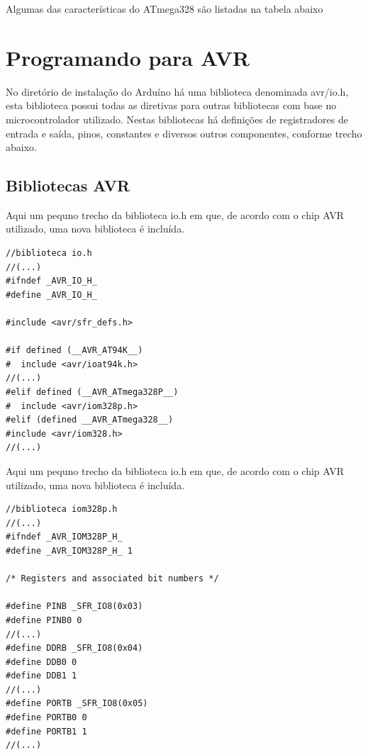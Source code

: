 Algumas das características do ATmega328 são listadas na tabela abaixo

\section{Programando para AVR}

No diretório de instalação do Arduíno há uma biblioteca denominada avr/io.h, esta biblioteca possui todas as diretivas para outras bibliotecas com base no microcontrolador utilizado. Nestas bibliotecas há definições de registradores de entrada e saída, pinos, constantes e diversos outros componentes, conforme trecho abaixo.

\subsection{Bibliotecas AVR}

Aqui um pequno trecho da biblioteca io.h em que, de acordo com o chip AVR utilizado, uma nova biblioteca é incluída.
\newline
\newline
\begin{lstlisting}
//biblioteca io.h
//(...)
#ifndef _AVR_IO_H_
#define _AVR_IO_H_

#include <avr/sfr_defs.h>

#if defined (__AVR_AT94K__)
#  include <avr/ioat94k.h>
//(...)
#elif defined (__AVR_ATmega328P__)
#  include <avr/iom328p.h>
#elif (defined __AVR_ATmega328__)
#include <avr/iom328.h>
//(...)

\end{lstlisting}

Aqui um pequno trecho da biblioteca io.h em que, de acordo com o chip AVR utilizado, uma nova biblioteca é incluída.

\begin{lstlisting}
//biblioteca iom328p.h
//(...)
#ifndef _AVR_IOM328P_H_
#define _AVR_IOM328P_H_ 1

/* Registers and associated bit numbers */

#define PINB _SFR_IO8(0x03)
#define PINB0 0
//(...)
#define DDRB _SFR_IO8(0x04)
#define DDB0 0
#define DDB1 1
//(...)
#define PORTB _SFR_IO8(0x05)
#define PORTB0 0
#define PORTB1 1
//(...)
\end{lstlisting}
